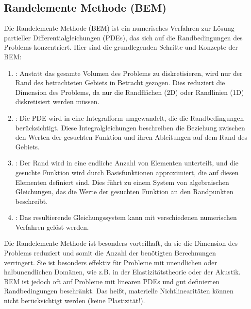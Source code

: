 \documentclass[letterpaper,10pt,german]{jupyterBook}
\begin{document}
\subsection{Randelemente Methode (BEM)}
\label{\detokenize{chapters/chapter1/Einf_xfchrung_Loesungsverfahren:randelemente-methode-bem}}
\sphinxAtStartPar
Die Randelemente Methode (BEM) ist ein numerisches Verfahren zur Lösung partieller Differentialgleichungen (PDEs), das sich auf die Randbedingungen des Problems konzentriert. Hier sind die grundlegenden Schritte und Konzepte der BEM:
\begin{enumerate}
%
\item {} 
\sphinxAtStartPar
{}: Anstatt das gesamte Volumen des Problems zu diskretisieren, wird nur der Rand des betrachteten Gebiets in Betracht gezogen. Dies reduziert die Dimension des Problems, da nur die Randflächen (2D) oder Randlinien (1D) diskretisiert werden müssen.

\item {} 
\sphinxAtStartPar
{}: Die PDE wird in eine Integralform umgewandelt, die die Randbedingungen berücksichtigt. Diese Integralgleichungen beschreiben die Beziehung zwischen den Werten der gesuchten Funktion und ihren Ableitungen auf dem Rand des Gebiets.

\item {} 
\sphinxAtStartPar
{}: Der Rand wird in eine endliche Anzahl von Elementen unterteilt, und die gesuchte Funktion wird durch Basisfunktionen approximiert, die auf diesen Elementen definiert sind. Dies führt zu einem System von algebraischen Gleichungen, das die Werte der gesuchten Funktion an den Randpunkten beschreibt.

\item {} 
\sphinxAtStartPar
{}: Das resultierende Gleichungssystem kann mit verschiedenen numerischen Verfahren gelöst werden.

\end{enumerate}

\sphinxAtStartPar
Die Randelemente Methode ist besonders vorteilhaft, da sie die Dimension des Problems reduziert und somit die Anzahl der benötigten Berechnungen verringert. Sie ist besonders effektiv für Probleme mit unendlichen oder halbunendlichen Domänen, wie z.B. in der Elastizitätstheorie oder der Akustik. BEM ist jedoch oft auf Probleme mit linearen PDEs und gut definierten Randbedingungen beschränkt. Das heißt, materielle Nichtlinearitäten können nicht berücksichtigt werden (keine Plastizität!).
\end{document}
